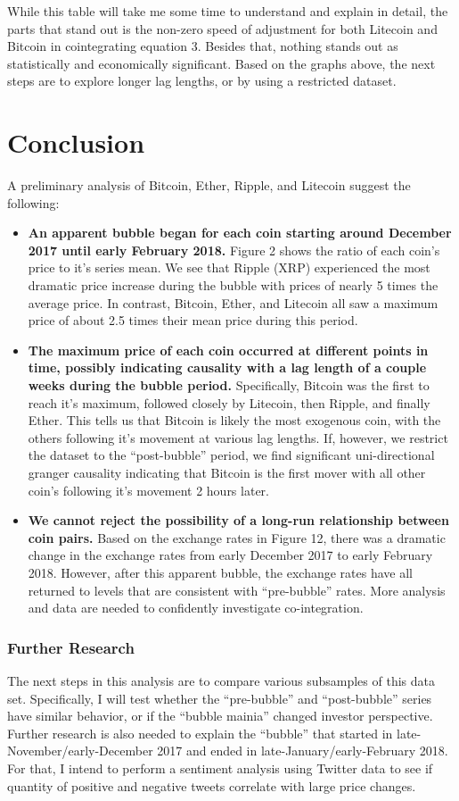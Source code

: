\documentclass{article}
\begin{document}
	While this table will take me some time to understand and explain in detail, the parts that stand out is the non-zero speed of adjustment for both Litecoin and Bitcoin in cointegrating equation 3. Besides that, nothing stands out as statistically and economically significant. Based on the graphs above, the next steps are to explore longer lag lengths, or by using a restricted dataset.  
	
	\section{Conclusion}
	A preliminary analysis of Bitcoin, Ether, Ripple, and Litecoin suggest the following: 
	\begin{itemize}
		\item \textbf{An apparent bubble began for each coin starting around December 2017 until early February 2018.} Figure 2 shows the ratio of each coin's price to it's series mean. We see that Ripple (XRP) experienced the most dramatic price increase during the bubble with prices of nearly 5 times the average price. In contrast, Bitcoin, Ether, and Litecoin all saw a maximum price of about 2.5 times their mean price during this period. 
		\item \textbf{The maximum price of each coin occurred at different points in time, possibly indicating causality with a lag length of a couple weeks during the bubble period.} Specifically, Bitcoin was the first to reach it's maximum, followed closely by Litecoin, then Ripple, and finally Ether. This tells us that Bitcoin is likely the most exogenous coin, with the others following it's movement at various lag lengths. If, however, we restrict the dataset to the ``post-bubble'' period, we find significant uni-directional granger causality indicating that Bitcoin is the first mover with all other coin's following it's movement 2 hours later.   
		\item \textbf{We cannot reject the possibility of a long-run relationship between coin pairs.} Based on the exchange rates in Figure 12, there was a dramatic change in the exchange rates from early December 2017 to early February 2018. However, after this apparent bubble, the exchange rates have all returned to levels that are consistent with ``pre-bubble'' rates. More analysis and data are needed to confidently investigate co-integration. 
	\end{itemize} 

	\subsubsection{Further Research}
	The next steps in this analysis are to compare various subsamples of this data set. Specifically, I will test whether the ``pre-bubble'' and ``post-bubble'' series have similar behavior, or if the ``bubble mainia'' changed investor perspective. Further research is also needed to explain the ``bubble'' that started in late-November/early-December 2017 and ended in late-January/early-February 2018. For that, I intend to perform a sentiment analysis using Twitter data to see if quantity of positive and negative tweets correlate with large price changes.  
	
\end{document}
